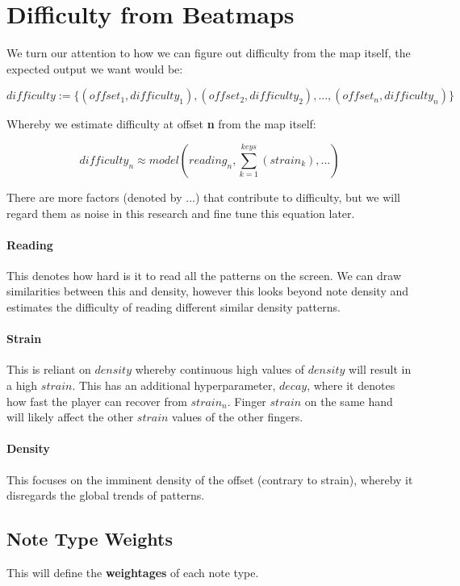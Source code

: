 
\section{Difficulty from Beatmaps}

We turn our attention to how we can figure out difficulty from the map itself, the expected output we want would be:

$$ difficulty := \lbrace(offset_1, difficulty_1), (offset_2, difficulty_2), ..., (offset_n, difficulty_n)\rbrace $$

Whereby we estimate difficulty at offset \textbf{n} from the map itself:

$$ difficulty_n \approx model \left( reading_n, \sum_{k=1}^{keys} \left(strain_k \right), ... \right)$$

There are more factors (denoted by $...$) that contribute to difficulty, but we will regard them as noise in this research and fine tune this equation later.

\paragraph{Reading} This denotes how hard is it to read all the patterns on the screen. We can draw similarities between this and density, however this looks beyond note density and estimates the difficulty of reading different similar density patterns.

\paragraph{Strain} This is reliant on $density$ whereby continuous high values of $ density$ will result in a high $strain$. This has an additional hyperparameter, $decay$, where it denotes how fast the player can recover from $strain_n$. Finger $strain$ on the same hand will likely affect the other $strain$ values of the other fingers.

\paragraph{Density} This focuses on the imminent density of the offset (contrary to strain), whereby it disregards the global trends of patterns.

\subsection{Note Type Weights}

This will define the \textbf{weightages} of each note type.
